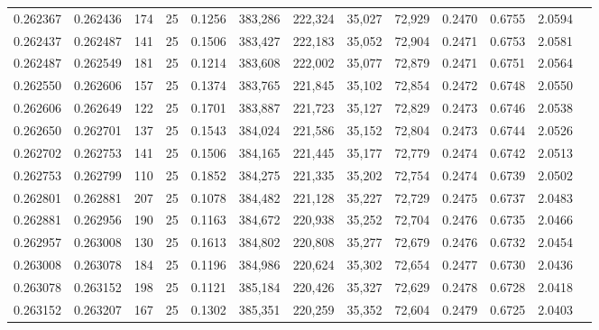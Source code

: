 \begin{tabular}{rrrrrrrrrrrrr}
0.262367 & 0.262436 &   174 &  25 &                                     0.1256 & 383,286 & 222,324 &  35,027 &  72,929 & 0.2470 & 0.6755 & 2.0594 \\
0.262437 & 0.262487 &   141 &  25 &                                     0.1506 & 383,427 & 222,183 &  35,052 &  72,904 & 0.2471 & 0.6753 & 2.0581 \\
0.262487 & 0.262549 &   181 &  25 &                                     0.1214 & 383,608 & 222,002 &  35,077 &  72,879 & 0.2471 & 0.6751 & 2.0564 \\
0.262550 & 0.262606 &   157 &  25 &                                     0.1374 & 383,765 & 221,845 &  35,102 &  72,854 & 0.2472 & 0.6748 & 2.0550 \\
0.262606 & 0.262649 &   122 &  25 &                                     0.1701 & 383,887 & 221,723 &  35,127 &  72,829 & 0.2473 & 0.6746 & 2.0538 \\
0.262650 & 0.262701 &   137 &  25 &                                     0.1543 & 384,024 & 221,586 &  35,152 &  72,804 & 0.2473 & 0.6744 & 2.0526 \\
0.262702 & 0.262753 &   141 &  25 &                                     0.1506 & 384,165 & 221,445 &  35,177 &  72,779 & 0.2474 & 0.6742 & 2.0513 \\
0.262753 & 0.262799 &   110 &  25 &                                     0.1852 & 384,275 & 221,335 &  35,202 &  72,754 & 0.2474 & 0.6739 & 2.0502 \\
0.262801 & 0.262881 &   207 &  25 &                                     0.1078 & 384,482 & 221,128 &  35,227 &  72,729 & 0.2475 & 0.6737 & 2.0483 \\
0.262881 & 0.262956 &   190 &  25 &                                     0.1163 & 384,672 & 220,938 &  35,252 &  72,704 & 0.2476 & 0.6735 & 2.0466 \\
0.262957 & 0.263008 &   130 &  25 &                                     0.1613 & 384,802 & 220,808 &  35,277 &  72,679 & 0.2476 & 0.6732 & 2.0454 \\
0.263008 & 0.263078 &   184 &  25 &                                     0.1196 & 384,986 & 220,624 &  35,302 &  72,654 & 0.2477 & 0.6730 & 2.0436 \\
0.263078 & 0.263152 &   198 &  25 &                                     0.1121 & 385,184 & 220,426 &  35,327 &  72,629 & 0.2478 & 0.6728 & 2.0418 \\
0.263152 & 0.263207 &   167 &  25 &                                     0.1302 & 385,351 & 220,259 &  35,352 &  72,604 & 0.2479 & 0.6725 & 2.0403 \\

\end{tabular}
